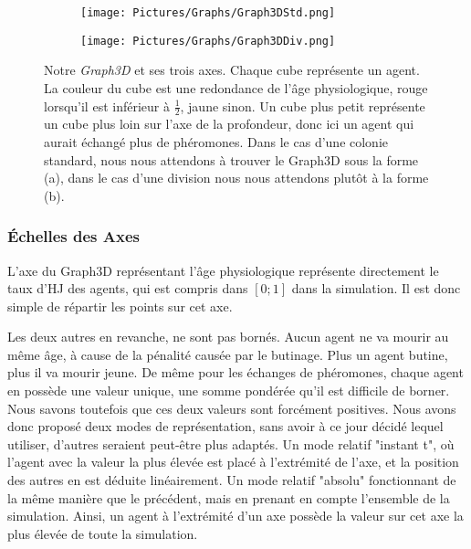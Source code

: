 	\begin{figure}
	\centering
	
	\begin{subfigure}{\textwidth}
	\centering
	\texttt{[image: Pictures/Graphs/Graph3DStd.png]}
	\caption{}
	\label{Graph3DStd}	
	\end{subfigure}
	
	\begin{subfigure}{\textwidth}
	\centering
	\texttt{[image: Pictures/Graphs/Graph3DDiv.png]}
	\caption{}
	\label{Graph3DDiv}
	\end{subfigure}
	
	\caption[Notre \textit{Graph3D} et ses trois axes.]{Notre \textit{Graph3D} et ses trois axes. Chaque cube représente un agent. La couleur du cube est une redondance de l'âge physiologique, rouge lorsqu'il est inférieur à $\frac{1}{2}$, jaune sinon. Un cube plus petit représente un cube plus loin sur l'axe de la profondeur, donc ici un agent qui aurait échangé plus de phéromones. Dans le cas d'une colonie standard, nous nous attendons à trouver le Graph3D sous la forme (a), dans le cas d'une division nous nous attendons plutôt à la forme (b).}	
	\label{Graph3D}
	\end{figure}
	
	\subsubsection{Échelles des Axes}
	L'axe du Graph3D représentant l'âge physiologique représente directement le taux d'HJ des agents, qui est compris dans $[0;1]$ dans la simulation. Il est donc simple de répartir les points sur cet axe.
	
	Les deux autres en revanche, ne sont pas bornés. Aucun agent ne va mourir au même âge, à cause de la pénalité causée par le butinage. Plus un agent butine, plus il va mourir jeune. De même pour les échanges de phéromones, chaque agent en possède une valeur unique, une somme pondérée qu'il est difficile de borner. Nous savons toutefois que ces deux valeurs sont forcément positives. Nous avons donc proposé deux modes de représentation, sans avoir à ce jour décidé lequel utiliser, d'autres seraient peut-être plus adaptés. Un mode relatif "instant t", où l'agent avec la valeur la plus élevée est placé à l'extrémité de l'axe, et la position des autres en est déduite linéairement. Un mode relatif "absolu" fonctionnant de la même manière que le précédent, mais en prenant en compte l'ensemble de la simulation. Ainsi, un agent à l'extrémité d'un axe possède la valeur sur cet axe la plus élevée de toute la simulation.
	
